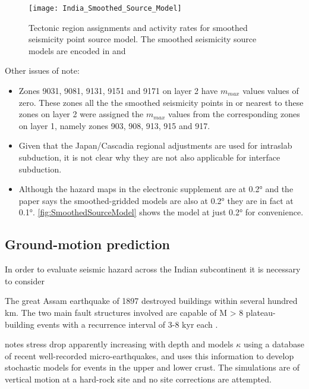 \documentclass{article}
\begin{document}
\begin{figure}[!htb]
\begin{adjustbox}{center}
\texttt{[image: India\_Smoothed\_Source\_Model]}
\end{adjustbox}
\caption[Smoothed seismicity point source model]{Tectonic region assignments and activity rates for smoothed seismicity point source model.
The smoothed seismicity source models are encoded in \texttt{} and \texttt{}}
\label{fig:SmoothedSourceModel}
\end{figure}

Other issues of note:
\begin{itemize}
\item Zones 9031, 9081, 9131, 9151 and 9171 on layer 2 have $m_{max}$ values values of zero.
These zones all the the smoothed seismicity points in or nearest to these zones on layer 2 were assigned the $m_{max}$ values from the corresponding zones on layer 1, namely zones 903, 908, 913, 915 and 917.
\item Given that the Japan/Cascadia regional adjustments are used for intraslab subduction, it is not clear why they are not also applicable for interface subduction.
\item Although the hazard maps in the electronic supplement are at 0.2° and the paper says the smoothed-gridded models are also at 0.2° they are in fact at 0.1°.
\autoref{fig:SmoothedSourceModel} shows the model at just 0.2° for convenience.
\end{itemize}

\subsection{Ground-motion prediction}
\label{subsec:GroundMotion}

In order to evaluate seismic hazard across the Indian subcontinent it is necessary to consider 

The great Assam earthquake of 1897 destroyed buildings within several hundred km.
The two main fault structures involved are capable of M > 8 plateau-building events with a recurrence interval of 3-8 kyr each \citep{bilham2001plateau}.

\cite{nath2012ground} notes stress drop apparently increasing with depth and models $\kappa$ using a database of recent well-recorded micro-earthquakes, and uses this information to develop stochastic models for events in the upper and lower crust.
The simulations are of vertical motion at a hard-rock site and no site corrections are attempted.
\end{document}
